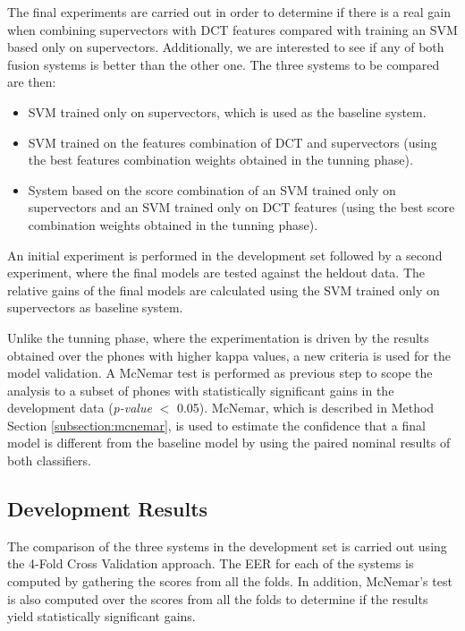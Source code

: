 The final experiments are carried out in order
to determine if there is a real gain when combining
supervectors with DCT features compared with training an SVM based only on supervectors.
Additionally, we are interested to see if any of both fusion systems is better
than the other one. The three systems to be compared are then:

\begin{itemize}
	\item SVM trained only on supervectors, which is used as the baseline system.
	\item SVM trained on the features combination of DCT and supervectors (using the best features combination weights obtained in the tunning phase).
	\item System based on the score combination of an SVM trained
	only on supervectors and an SVM trained
	only on DCT features (using the best score combination weights obtained in the tunning phase).
\end{itemize}

An initial experiment is performed in the development set
followed by a second experiment, where
the final models are tested against the heldout data.
The relative gains of the final models
are calculated using the SVM trained only on supervectors as baseline system.

Unlike the tunning phase, where the experimentation is driven by the results obtained
over the phones with higher kappa values, a new criteria is used for the model validation.
A McNemar test is performed as previous step to scope the analysis
to a subset of phones with statistically significant gains in the development
data (\textit{p-value} $<$ 0.05).
McNemar, which is described in Method Section \ref{subsection:mcnemar},
is used to estimate the confidence that a final model is different from
the baseline model by using the paired nominal results of both classifiers.


\subsection{Development Results}

The comparison of the three systems
in the development set is carried out using the 4-Fold Cross Validation
approach. The EER for each of
the systems is computed
by gathering the scores from all the folds.
In addition, McNemar's test is also computed
over the scores from all the folds to determine if the
results yield statistically significant gains.

